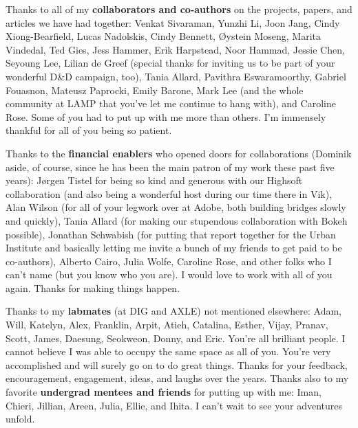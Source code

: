 \documentclass[12pt]{cmuthesis}
\begin{document}
Thanks to all of my \textbf{collaborators and co-authors} on the projects, papers, and articles we have had together: Venkat Sivaraman, Yunzhi Li, Joon Jang, Cindy Xiong-Bearfield, Lucas Nadolskis, Cindy Bennett, Øystein Moseng, Marita Vindedal, Ted Gies, Jess Hammer, Erik Harpstead, Noor Hammad, Jessie Chen, Seyoung Lee, Lilian de Greef (special thanks for inviting us to be part of your wonderful D\&D campaign, too), Tania Allard, Pavithra Eswaramoorthy, Gabriel Fouasnon, Mateusz Paprocki, Emily Barone, Mark Lee (and the whole community at LAMP that you've let me continue to hang with), and Caroline Rose. Some of you had to put up with me more than others. I'm immensely thankful for all of you being so patient.

Thanks to the \textbf{financial enablers} who opened doors for collaborations (Dominik aside, of course, since he has been the main patron of my work these past five years): Jørgen Tistel for being so kind and generous with our Highsoft collaboration (and also being a wonderful host during our time there in Vik), Alan Wilson (for all of your legwork over at Adobe, both building bridges slowly and quickly), Tania Allard (for making our stupendous collaboration with Bokeh possible), Jonathan Schwabish (for putting that report together for the Urban Institute and basically letting me invite a bunch of my friends to get paid to be co-authors), Alberto Cairo, Julia Wolfe, Caroline Rose, and other folks who I can't name (but you know who you are). I would love to work with all of you again. Thanks for making things happen.

Thanks to my \textbf{labmates} (at DIG and AXLE) not mentioned elsewhere: Adam, Will, Katelyn, Alex, Franklin, Arpit, Atieh, Catalina, Esther, Vijay, Pranav, Scott, James, Daesung, Seokweon, Donny, and Eric. You're all brilliant people. I cannot believe I was able to occupy the same space as all of you. You're very accomplished and will surely go on to do great things. Thanks for your feedback, encouragement, engagement, ideas, and laughs over the years. Thanks also to my favorite \textbf{undergrad mentees and friends} for putting up with me: Iman, Chieri, Jillian, Areen, Julia, Ellie, and Ihita. I can't wait to see your adventures unfold.
\end{document}
